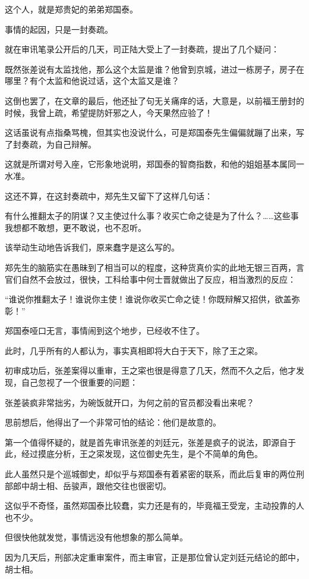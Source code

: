 \begin{multicols}{\theparacolNo}
		这个人，就是郑贵妃的弟弟郑国泰。

		事情的起因，只是一封奏疏。

		就在审讯笔录公开后的几天，司正陆大受上了一封奏疏，提出了几个疑问：

		既然张差说有太监找他，那么这个太监是谁？他曾到京城，进过一栋房子，房子在哪里？有个太监和他说过话，这个太监又是谁？

		这倒也罢了，在文章的最后，他还扯了句无关痛痒的话，大意是，以前福王册封的时候，我曾上疏，希望提防奸邪之人，今天果然应验了！

		这话虽说有点指桑骂槐，但其实也没说什么，可是郑国泰先生偏偏就蹦了出来，写了封奏疏，为自己辩解。

		这就是所谓对号入座，它形象地说明，郑国泰的智商指数，和他的姐姐基本属同一水准。

		这还不算，在这封奏疏中，郑先生又留下了这样几句话：

		有什么推翻太子的阴谋？又主使过什么事？收买亡命之徒是为了什么？……这些事我想都不敢想，更不敢说，也不忍听。

		该举动生动地告诉我们，原来蠢字是这么写的。

		郑先生的脑筋实在愚昧到了相当可以的程度，这种货真价实的此地无银三百两，言官们自然不会放过，很快，工科给事中何士晋就做出了反应，相当激烈的反应：

		“谁说你推翻太子！谁说你主使！谁说你收买亡命之徒！你既辩解又招供，欲盖弥彰！”

		郑国泰哑口无言，事情闹到这个地步，已经收不住了。

		此时，几乎所有的人都认为，事实真相即将大白于天下，除了王之寀。

		初审成功后，张差案得以重审，王之寀也很是得意了几天，然而不久之后，他才发现，自己忽视了一个很重要的问题：

		张差装疯非常拙劣，为碗饭就开口，为何之前的官员都没看出来呢？

		思前想后，他得出了一个非常可怕的结论：他们是故意的。

		第一个值得怀疑的，就是首先审讯张差的刘廷元，张差是疯子的说法，即源自于此，经过摸底分析，王之寀发现，这位御史先生，是个不简单的角色。

		此人虽然只是个巡城御史，却似乎与郑国泰有着紧密的联系，而此后复审的两位刑部郎中胡士相、岳骏声，跟他交往也很密切。

		这似乎不奇怪，虽然郑国泰比较蠢，实力还是有的，毕竟福王受宠，主动投靠的人也不少。

		但很快他就发觉，事情远没有他想象的那么简单。

		因为几天后，刑部决定重审案件，而主审官，正是那位曾认定刘廷元结论的郎中，胡士相。


\end{multicols}
